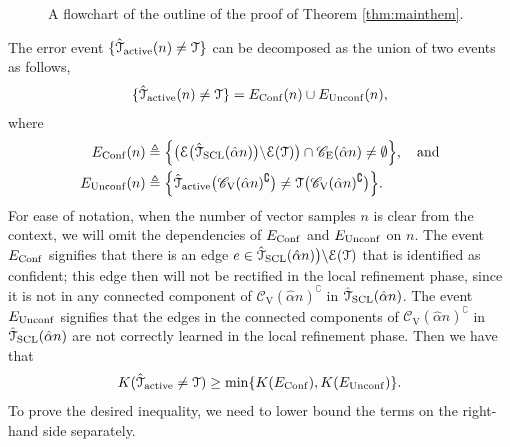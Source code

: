 \documentclass[11pt,onecolumn]{article}
\newcommand{\calE}{\mathcal{E}}
\newcommand{\calT}{\mathcal{T}}
\newcommand{\hatcalT}{\hat{\calT}}
\newcommand{\scC}{\mathscr{C}}
\newcommand{\halpha}{\hat{\alpha}}
\newcommand{\Active}{{\rm active}}
\begin{document}
\begin{figure}[t]
	\caption{A flowchart of the outline of the proof of Theorem \ref{thm:mainthem}.} 
	\label{fig:prooffig} 
\end{figure}
The error event $\{\hatcalT_{\Active}(n)\neq \calT\}$ can be decomposed as the union of two events as follows,
\begin{align}
	\{\hatcalT_{\Active}(n)\neq \calT\}=E_{{\rm Conf}}(n)\cup E_{{\rm Unconf}}(n),
\end{align}
where
\begin{align}
	E_{{\rm Conf}}(n)&\triangleq\Big\{\big(\calE\big(\hatcalT_{\rm{SCL}}(\halpha n)\big)\backslash \calE(\calT)\big)\cap \scC_{\mathrm{E}}(\halpha n)\neq \emptyset\Big\},\quad\text{and}\\*
	E_{{\rm Unconf}}(n)&\triangleq\Big\{\hatcalT_{\Active}\big(\scC_{\mathrm{V}}(\halpha n)^{\complement}\big)\neq \calT\big(\scC_{\mathrm{V}}(\halpha n)^{\complement}\big)\Big\}.
\end{align}
For ease of notation, when the number of vector samples $n$ is clear from the context, we will omit the dependencies of   $E_{{\rm Conf}}$ and $E_{{\rm Unconf}}$ on $n$. The event $E_{{\rm Conf}}$ signifies that there is an edge $e\in \hatcalT_{\rm{SCL}}(\halpha n)\big)\backslash \calE(\calT)$ that is identified as confident; this edge then will not be 
rectified in the local refinement phase, since it is not in any connected component of $\scC_{\mathrm{V}}(\halpha n)^{\complement}$ in $\hatcalT_{{\rm SCL}}(\halpha n)$. The event $E_{{\rm Unconf}}$ signifies that the edges in the connected components of $\scC_{\mathrm{V}}(\halpha n)^{\complement}$ 
in $\hatcalT_{{\rm SCL}}(\halpha n)$ are not correctly learned in the local refinement phase. Then we have that
\begin{align}
	K (\hatcalT_{\Active}\neq \calT)\geq \min \{K (E_{{\rm Conf}}),K (E_{{\rm Unconf}})\}.
\end{align}
To prove the desired inequality, we need to lower bound the terms on the right-hand side separately. 
\end{document}
